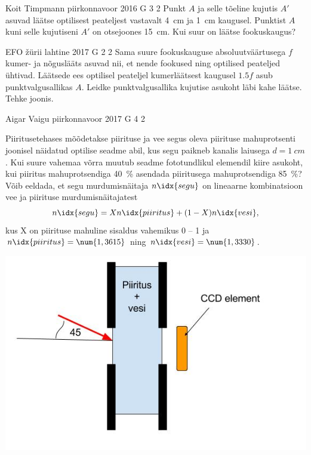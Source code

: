 \documentclass[11pt]{article}
\begin{document}
{%
{Koit Timpmann} %
{piirkonnavoor} %
{2016} %
{G 3} %
{2} %
{
\ifStatement
Punkt $A$ ja selle tõeline kujutis $A'$ asuvad läätse optilisest peateljest vastavalt \SI{4}{cm} ja \SI{1}{cm} kaugusel. Punktist $A$ kuni selle kujutiseni $A'$ on otsejoones \SI{15}{cm}. Kui suur on läätse fookuskaugus?
\fi
}

{EFO žürii} %
{lahtine} %
{2017} %
{G 2} %
{2} %
{
\ifStatement
Sama suure fookuskauguse absoluutväärtusega $f$ kumer- ja nõguslääts asuvad nii, et nende fookused ning optilised peateljed ühtivad. Läätsede ees optilisel peateljel kumerläätsest kaugusel $\num{1,5}f$ asub punktvalgusallikas $A$. Leidke punktvalgusallika kujutise asukoht läbi kahe läätse. Tehke joonis.
\fi
}

{Aigar Vaigu} %
{piirkonnavoor} %
{2017} %
{G 4} %
{2} %
{
\ifStatement
Piiritusetehases mõõdetakse piirituse ja vee segus oleva piirituse mahuprotsenti joonisel näidatud optilise seadme abil, kus segu paikneb kanalis laiusega $d=\SI{1}{cm}$. 
Kui suure vahemaa võrra muutub seadme fototundlikul elemendil kiire asukoht, kui piiritus mahuprotsendiga \SI{40}{\percent} asendada piiritusega mahuprotsendiga \SI{85}{\percent}?
Võib eeldada, et segu murdumisnäitaja $n\idx{segu}$ on lineaarne kombinatsioon vee ja piirituse murdumisnäitajatest
$$
n\idx{segu}=Xn\idx{piiritus}+(1-X)n\idx{vesi},
$$
kus X on piirituse mahuline sisaldus vahemikus 0 -- 1 ja $n\idx{piiritus}=\num{1,3615}$ ning $n\idx{vesi}=\num{1,3330}$.

\begin{center}
	\vspace{-0pt}
	\includegraphics[width=0.5\linewidth]{2017-v2g-04-Piiritusetehas.jpg}
	\vspace{-10pt}
\end{center}
\fi
}

}
\end{document}
